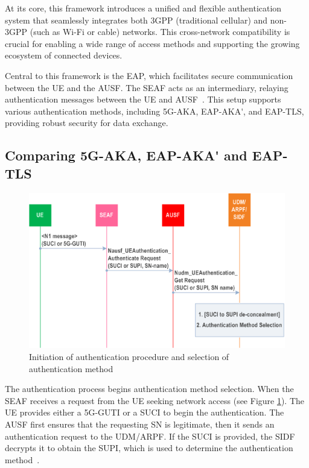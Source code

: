 At its core, this framework introduces a unified and flexible authentication system that seamlessly integrates both \ac{3GPP} (traditional cellular) and non-\ac{3GPP} (such as Wi-Fi or cable) networks. This cross-network compatibility is crucial for enabling a wide range of access methods and supporting the growing ecosystem of connected devices.

Central to this framework is the \ac{EAP}, which facilitates secure communication between the \ac{UE} and the \ac{AUSF}. The \ac{SEAF} acts as an intermediary, relaying authentication messages between the \ac{UE} and \ac{AUSF}~\cite{33.501-p46}. This setup supports various authentication methods, including \ac{5G-AKA}, \ac{EAP-AKA'}, and \ac{EAP-TLS}, providing robust security for data exchange.

\subsection{Comparing \acs{5G-AKA}, \acs{EAP-AKA'} and \acs{EAP-TLS}}

\begin{figure}
    \centering
    \includegraphics[width=0.75\linewidth]{figs/Initiation of authentication procedure and selection of authentication method.png}
    \caption{Initiation of authentication procedure and selection of authentication method}
    \label{fig:Initiation of authentication procedure and selection of authentication method}
\end{figure}

The authentication process begins authentication method selection. When the \ac{SEAF} receives a request from the \ac{UE} seeking network access (see Figure \ref{fig:Initiation of authentication procedure and selection of authentication method}). The \ac{UE} provides either a \acf{5G-GUTI} or a \ac{SUCI} to begin the authentication. The \ac{AUSF} first ensures that the requesting \ac{SN} is legitimate, then it sends an authentication request to the \ac{UDM}/\ac{ARPF}. If the \ac{SUCI} is provided, the \ac{SIDF} decrypts it to obtain the \ac{SUPI}, which is used to determine the authentication method~\cite{33.501-p48}.

